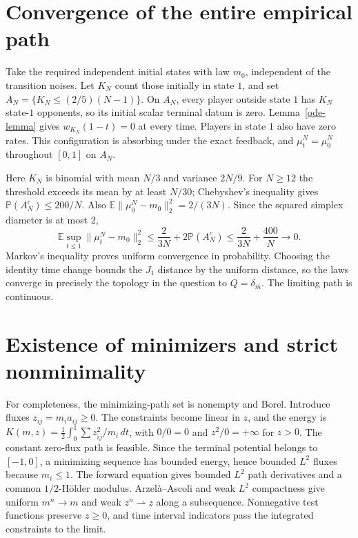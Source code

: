 \documentclass[11pt,a4paper]{article}
\newcommand{\E}{\mathbb E}
\newcommand{\Prb}{\mathbb P}
\begin{document}
\section{Convergence of the entire empirical path}
Take the required independent initial states with law $m_0$, independent
of the transition noises. Let $K_N$ count those initially in state $1$,
and set $A_N=\{K_N\le(2/5)(N-1)\}$. On $A_N$, every player outside
state $1$ has $K_N$ state-$1$ opponents, so its initial scalar terminal
datum is zero. Lemma~\ref{ode-lemma} gives
$w_{K_N}(1-t)=0$ at every time. Players in state $1$ also have zero
rates. This configuration is absorbing under the exact feedback,
and $\mu_t^N=\mu_0^N$ throughout $[0,1]$ on $A_N$.

Here $K_N$ is binomial with mean $N/3$ and variance $2N/9$.
For $N\ge12$ the threshold exceeds its mean by at least $N/30$;
Chebyshev's inequality gives $\Prb(A_N^c)\le200/N$. Also
$\E\|\mu_0^N-m_0\|_2^2=2/(3N)$.
Since the squared simplex diameter is at most $2$,
\begin{equation}\label{convergence}
 \E\sup_{t\le1}\|\mu_t^N-m_0\|_2^2
 \le\frac{2}{3N}+2\Prb(A_N^c)
 \le\frac{2}{3N}+\frac{400}{N}\longrightarrow0.
\end{equation}
Markov's inequality proves uniform convergence in probability.
Choosing the identity time change bounds the $J_1$ distance by the
uniform distance, so the laws converge in precisely the topology in
the question to $Q=\delta_{\bar m}$. The limiting path is continuous.

\section{Existence of minimizers and strict nonminimality}
For completeness, the minimizing-path set is nonempty and Borel.
Introduce fluxes $z_{ij}=m_i a_{ij}\ge0$. The constraints become linear
in $z$, and the energy is
$K(m,z)=\frac12\int_0^1\sum z_{ij}^2/m_i\,dt$, with $0/0=0$ and
$z^2/0=+\infty$ for $z>0$. The constant zero-flux path is feasible.
Since the terminal potential belongs to $[-1,0]$, a minimizing sequence
has bounded energy, hence bounded $L^2$ fluxes because $m_i\le1$.
The forward equation gives bounded $L^2$ path derivatives and a common
$1/2$-H\"older modulus. Arzel\`a--Ascoli and weak $L^2$ compactness
give uniform $m^n\to m$ and weak $z^n\rightharpoonup z$ along a
subsequence. Nonnegative test functions preserve $z\ge0$, and time
interval indicators pass the integrated constraints to the limit.
\end{document}

